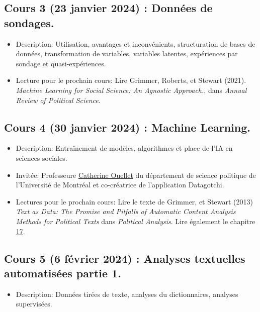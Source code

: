 \documentclass[
  letterpaper,
  DIV=11,
  numbers=noendperiod]{scrartcl}
\providecommand{\tightlist}{%
  \setlength{\itemsep}{0pt}\setlength{\parskip}{0pt}}\usepackage{longtable,booktabs,array}
\begin{document}
\subsection{Cours 3 (23 janvier 2024) : Données de
sondages.}\label{cours-3-23-janvier-2024-donnuxe9es-de-sondages.}

\begin{itemize}
\item
  Description: Utilisation, avantages et inconvénients, structuration de
  bases de données, transformation de variables, variables latentes,
  expériences par sondage et quasi-expériences.
\item
  Lecture pour le prochain cours: Lire Grimmer, Roberts, et Stewart
  (2021). \emph{Machine Learning for Social Science: An Agnostic
  Approach.}, dans \emph{Annual Review of Political Science}.
\end{itemize}

\subsection{Cours 4 (30 janvier 2024) : Machine
Learning.}\label{cours-4-30-janvier-2024-machine-learning.}

\begin{itemize}
\item
  Description: Entraînement de modèles, algorithmes et place de l'IA en
  sciences sociales.
\item
  Invitée: Professeure
  \href{https://www.catherineouellet.com/}{Catherine Ouellet} du
  département de science politique de l'Université de Montréal et
  co-créatrice de l'application Datagotchi.
\item
  Lectures pour le prochain cours: Lire le texte de Grimmer, et Stewart
  (2013) \emph{Text as Data: The Promise and Pitfalls of Automatic
  Content Analysis Methods for Political Texts} dans \emph{Political
  Analysis}. Lire également le chapitre
  \href{https://tellingstorieswithdata.com/16-text.html}{17}.
\end{itemize}

\subsection{Cours 5 (6 février 2024) : Analyses textuelles automatisées
partie
1.}\label{cours-5-6-fuxe9vrier-2024-analyses-textuelles-automatisuxe9es-partie-1.}

\begin{itemize}
\tightlist
\item
  Description: Données tirées de texte, analyses du dictionnaires,
  analyses supervisées.
\end{itemize}
\end{document}
